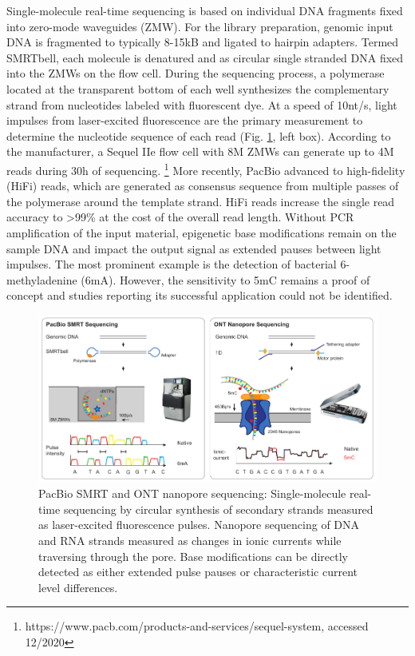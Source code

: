 Single-molecule real-time sequencing is based on individual DNA fragments fixed into zero-mode waveguides (ZMW).
For the library preparation, genomic input DNA is fragmented to typically 8-15kB and ligated to hairpin adapters.
Termed SMRTbell, each molecule is denatured and as circular single stranded DNA fixed into the ZMWs on the flow cell.
During the sequencing process, a polymerase located at the transparent bottom of each well synthesizes the complementary strand from nucleotides labeled with fluorescent dye.
At a speed of 10nt/s, light impulses from laser-excited fluorescence are the primary measurement to determine the nucleotide sequence of each read (Fig. \ref{fig:intro:longread}, left box).
According to the manufacturer, a Sequel IIe flow cell with 8M ZMWs can generate up to 4M reads during 30h of sequencing. \footnote{https://www.pacb.com/products-and-services/sequel-system, accessed 12/2020}
More recently, PacBio advanced to high-fidelity (HiFi) reads, which are generated as consensus sequence from multiple passes of the polymerase around the template strand.
HiFi reads increase the single read accuracy to >99\% at the cost of the overall read length.
Without PCR amplification of the input material, epigenetic base modifications remain on the sample DNA and impact the output signal as extended pauses between light impulses.
The most prominent example is the detection of bacterial 6-methyladenine (6mA). 
However, the sensitivity to 5mC remains a proof of concept and studies reporting its successful application could not be identified.

\begin{figure}[h]
	\centering
	\includegraphics[width=1.0\textwidth]{figures/intro/long_read.pdf}
	\captionsetup{format=plain}
	\caption[Long read sequencing]{PacBio SMRT and ONT nanopore sequencing: Single-molecule real-time sequencing by circular synthesis of secondary strands measured as laser-excited fluorescence pulses. Nanopore sequencing of DNA and RNA strands measured as changes in ionic currents while traversing through the pore. Base modifications can be directly detected as either extended pulse pauses or characteristic current level differences.}
	\label{fig:intro:longread}
\end{figure}


